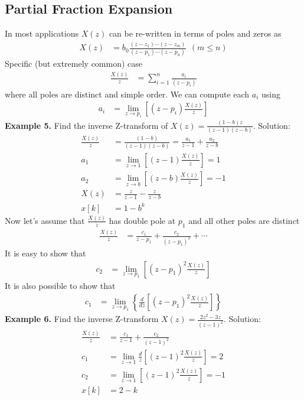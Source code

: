 \documentclass[twoside]{article}
\begin{document}
\subsection*{Partial Fraction Expansion}
%
In most applications $X(z)$ can be re-written in terms of
poles and zeros as
%
\begin{align*}
    X(z) &= b_0 \frac{(z- z_1) \cdots (z- z_m)}{(z- p_1) \cdots (z-p_n)} \ \ (m \leq n)
\end{align*}
%
Specific (but extremely common) case 
%
\begin{align*}
    \frac{X(z)}{z} &= \sum\limits_{i=1}^n \frac{a_i}{(z- p_i)} 
\end{align*}
%
where all poles are distinct and simple order. We can compute 
each $a_i$ using
%
\begin{align*}
    a_i &= \lim_{z \to p_i} \left[ (z- p_i) \frac{X(z)}{z}  \right]
\end{align*}
%
\textbf{Example 5.} Find the  inverse Z-transform of $X(z) =
\frac{(1-b)z}{(z-1) (z-b)}$. Solution:
%
\begin{align*}
    \frac{X(z)}{z} &= \frac{(1-b)}{(z-1) (z-b)} = \frac{a_1}{z-1} + 
                     \frac{a_2}{z-b} \\
    a_1 &= \lim_{z \to 1} \left[ (z -1) \frac{X(z)}{z} \right] = 1 \\
    a_2 &= \lim_{z \to b} \left[ (z -b) \frac{X(z)}{z} \right] = -1 \\
   X(z) &= \frac{z}{z-1} - \frac{z}{z-b} \\
   x[k] &= 1 - b^k
\end{align*}
%
Now let's assume that $\frac{X(z)}{z}$ has double pole at $p_1$ and
all other poles are distinct 
%
\begin{align*}
    \frac{X(z)}{z} &= \frac{c_1}{z- p_1}  + \frac{c_2}{(z- p_1)^2} + \cdots
\end{align*}
%
It is easy to show that
%
\begin{align*}
    c_2 &= \lim_{z \to p_1} \left[ (z- p_1)^2 \frac{X(z)}{z}  \right]
\end{align*}
%
It is also possible to show that
%
\begin{align*}
    c_1 &= \lim_{z \to p_1} \left\lbrace \frac{d}{dz}\left[ (z- p_1)^2
          \frac{X(z)}{z}  \right] \right \rbrace
\end{align*}
%
\textbf{Example 6.} Find the  inverse Z-transform $X(z) =
\frac{2 z^2 - 3 z}{(z-1)^2}$. Solution:
%
\begin{align*}
    \frac{X(z)}{z} &=  \frac{c_1}{z- 1}  + \frac{c_2}{(z-1)^2} \\
    c_1 &= \lim_{z \to 1} \frac{d}{z} \left[ (z -1)^2 \frac{X(z)}{z} \right] = 2 \\
    c_2 &= \lim_{z \to 1} \left[ (z -1)^2 \frac{X(z)}{z} \right] = -1 \\
   x[k] &= 2 - k
\end{align*}
\end{document}
